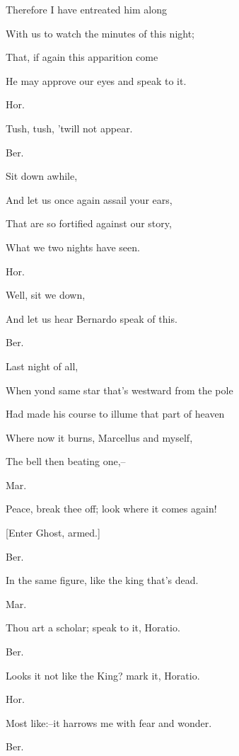 \documentclass[12pt]{book}
\begin{document}
Therefore I have entreated him along

With us to watch the minutes of this night;

That, if again this apparition come

He may approve our eyes and speak to it.



Hor.

Tush, tush, 'twill not appear.



Ber.

Sit down awhile,

And let us once again assail your ears,

That are so fortified against our story,

What we two nights have seen.



Hor.

Well, sit we down,

And let us hear Bernardo speak of this.



Ber.

Last night of all,

When yond same star that's westward from the pole

Had made his course to illume that part of heaven

Where now it burns, Marcellus and myself,

The bell then beating one,--



Mar.

Peace, break thee off; look where it comes again!



[Enter Ghost, armed.]



Ber.

In the same figure, like the king that's dead.



Mar.

Thou art a scholar; speak to it, Horatio.



Ber.

Looks it not like the King? mark it, Horatio.



Hor.

Most like:--it harrows me with fear and wonder.



Ber.
\end{document}

